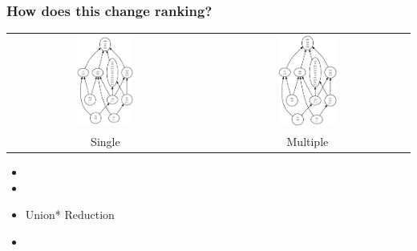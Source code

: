 \documentclass[svgnames,14pt]{beamer}
\theoremstyle{definition}
\begin{document}
\begin{frame}
\frametitle{How does this change ranking?}

\begin{center} 
\begin{tabular}{cc}
\includegraphics[width=0.3\textwidth]{rank1.ps}
&
\includegraphics[width=0.3\textwidth]{rank2.ps}\\
Single &
Multiple \\
\end{tabular}
\end{center}

\end{frame}


\begin{frame}
\begin{itemize}
\frametitle{Overview}
\item {}
\item {}
\item Union* Reduction
\item {}
\end{itemize}
\end{frame}
\end{document}
